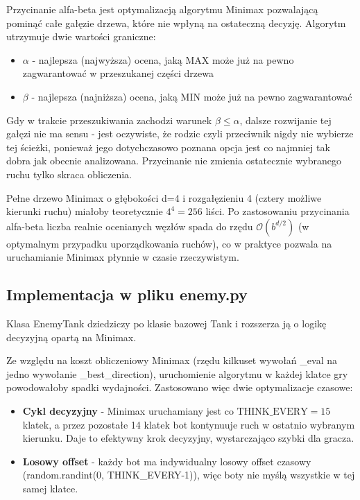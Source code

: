 Przycinanie alfa-beta jest optymalizacją algorytmu Minimax pozwalającą pominąć całe gałęzie drzewa, 
które nie wpłyną na ostateczną decyzję. Algorytm utrzymuje dwie wartości graniczne:
 
\begin{itemize}
    \item $\alpha$ - najlepsza (najwyższa) ocena, jaką MAX może już na pewno zagwarantować w przeszukanej części drzewa
    \item $\beta$ - najlepsza (najniższa) ocena, jaką MIN może już na pewno zagwarantować
\end{itemize}
 
Gdy w trakcie przeszukiwania zachodzi warunek $\beta \le \alpha$, dalsze rozwijanie tej gałęzi nie ma sensu - jest oczywiste, 
że rodzic czyli przeciwnik nigdy nie wybierze tej ścieżki, ponieważ jego dotychczasowo poznana opcja jest co najmniej tak dobra 
jak obecnie analizowana. Przycinanie nie zmienia ostatecznie wybranego ruchu tylko skraca obliczenia.
 
Pełne drzewo Minimax o głębokości d=4 i rozgałęzieniu 4 (cztery możliwe kierunki ruchu) miałoby teoretycznie $4^4 = 256$ liści. 
Po zastosowaniu przycinania alfa-beta liczba realnie ocenianych węzłów spada do rzędu $\mathcal{O}(b^{d/2})$ 
(w optymalnym przypadku uporządkowania ruchów), co w praktyce pozwala na uruchamianie Minimax płynnie w czasie rzeczywistym.

\subsection{Implementacja w pliku enemy.py}

Klasa EnemyTank dziedziczy po klasie bazowej Tank i rozszerza ją o logikę decyzyjną opartą 
na Minimax.


 
Ze względu na koszt obliczeniowy Minimax (rzędu kilkuset wywołań \_eval na jedno wywołanie \_best\_direction),
uruchomienie algorytmu w każdej klatce gry powodowałoby spadki wydajności. Zastosowano więc dwie optymalizacje czasowe:
 
\begin{itemize}
    \item \textbf{Cykl decyzyjny} - Minimax uruchamiany jest co $\text{THINK\_EVERY} = 15$ klatek, a przez pozostałe
     14 klatek bot kontynuuje ruch w ostatnio wybranym kierunku. Daje to efektywny krok decyzyjny, wystarczająco szybki 
     dla gracza.
    \item \textbf{Losowy offset} - każdy bot ma indywidualny losowy offset czasowy (random.randint(0, THINK\_EVERY-1)), 
    więc boty nie myślą wszystkie w tej samej klatce.
\end{itemize}
 
